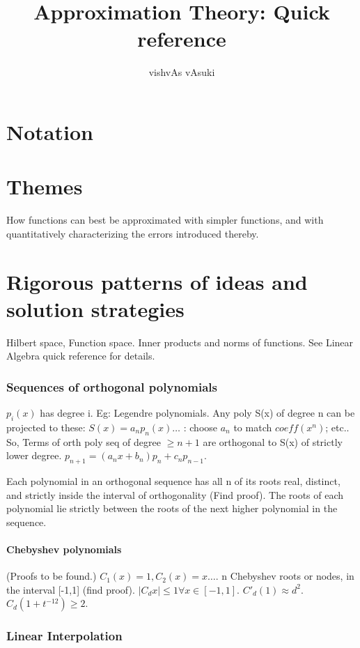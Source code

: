 \documentclass[10pt]{amsart}
\title{Approximation Theory: Quick reference}
\author{vishvAs vAsuki}
\begin{document}
\maketitle

\part{Notation}

\part{Themes}
How functions can best be approximated with simpler functions, and with quantitatively characterizing the errors introduced thereby.

\part{Rigorous patterns of ideas and solution strategies}
Hilbert space, Function space. Inner products and norms of functions. See Linear Algebra quick reference for details.

\section{Sequences of orthogonal polynomials}
$p_{i}(x)$ has degree i. Eg: Legendre polynomials. Any poly S(x) of degree n can be projected to these: $S(x) = a_{n}p_{n}(x) \dots$ : choose $a_{n}$ to match $coeff(x^{n})$; etc.. So, Terms of orth poly seq of degree $\geq n+1$ are orthogonal to S(x) of strictly lower degree. $p_{n+1} = (a_{n}x+b_{n})p_{n} + c_{n}p_{n-1}$.

Each polynomial in an orthogonal sequence has all n of its roots real, distinct, and strictly inside the interval of orthogonality (Find proof). The roots of each polynomial lie strictly between the roots of the next higher polynomial in the sequence. \why

\subsection{Chebyshev polynomials}
(Proofs to be found.) $C_{1}(x) = 1, C_{2}(x) = x \dots$. n Chebyshev roots or nodes, in the interval [-1,1] (find proof). $|C_{d}x| \leq 1 \forall x \in [-1,1]$. $C'_{d}(1)\approx d^{2}$. $C_{d}(1+t^{-12}) \geq 2$.

\section{Linear Interpolation}
\end{document}
